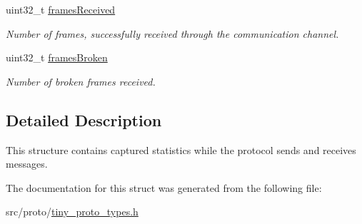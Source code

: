\begin{DoxyCompactItemize}
\mbox{\label{structSTinyStats_a19dfd3a62dbb9d86f6fb77eb1ea6f871}} 
uint32\+\_\+t \hyperlink{structSTinyStats_a19dfd3a62dbb9d86f6fb77eb1ea6f871}{frames\+Received}
\begin{DoxyCompactList}\small\item\em Number of frames, successfully received through the communication channel. \end{DoxyCompactList}\item 
\mbox{\label{structSTinyStats_abe4f4a9455b532e22f29e60789386130}} 
uint32\+\_\+t \hyperlink{structSTinyStats_abe4f4a9455b532e22f29e60789386130}{frames\+Broken}
\begin{DoxyCompactList}\small\item\em Number of broken frames received. \end{DoxyCompactList}\end{DoxyCompactItemize}


\subsection{Detailed Description}
This structure contains captured statistics while the protocol sends and receives messages. 

The documentation for this struct was generated from the following file\+:\begin{DoxyCompactItemize}
\item 
src/proto/\hyperlink{tiny__proto__types_8h}{tiny\+\_\+proto\+\_\+types.\+h}\end{DoxyCompactItemize}
